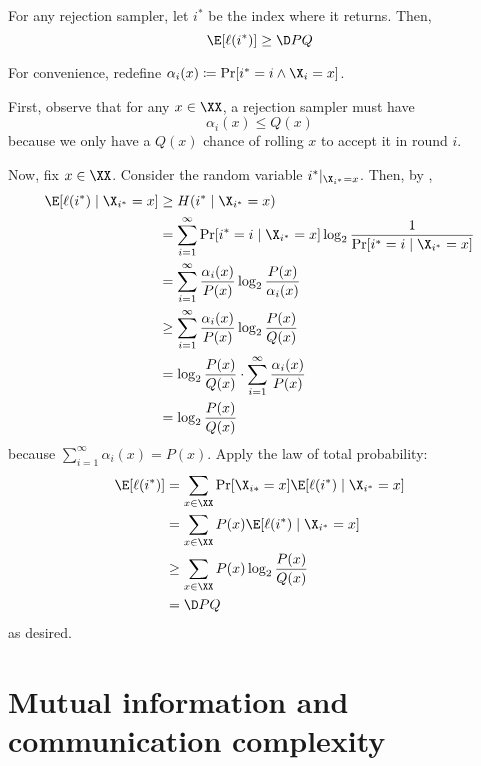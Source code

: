 \documentclass[class=co432,notes,tikz]{agony}
\begin{document}
\begin{prop}\label{prop:rejbest}
  For any rejection sampler, let $i^*$ be the index where it returns. Then,
  \[ \E[\ell(i^*)] \geq \D P Q \]
\end{prop}
\begin{prf}
  For convenience, redefine $\alpha_i(x) \coloneqq \Pr[i^* = i \land \X_i = x]$.

  First, observe that for any $x\in\XX$, a rejection sampler must have
  \[ \alpha_i(x) \leq Q(x) \]
  because we only have a $Q(x)$ chance of rolling $x$ to accept it in round $i$.

  Now, fix $x\in\XX$. Consider the random variable $i^*|_{\X_{i^*}=x}$.
  Then, by ,
  \begin{align*}
    \E[\ell(i^*) \mid \X_{i^*}=x]
     & \geq H(i^* \mid \X_{i^*}=x)                                                             \\
     & = \sum_{i=1}^\infty \Pr[i^*=i\mid \X_{i^*}=x]\log_2\frac{1}{\Pr[i^*=i \mid \X_{i^*}=x]} \\
     & = \sum_{i=1}^\infty \frac{\alpha_i(x)}{P(x)}\log_2\frac{P(x)}{\alpha_i(x)}              \\
     & \geq \sum_{i=1}^\infty \frac{\alpha_i(x)}{P(x)}\log_2\frac{P(x)}{Q(x)}                  \\
     & = \log_2\frac{P(x)}{Q(x)} \cdot \sum_{i=1}^\infty \frac{\alpha_i(x)}{P(x)}              \\
     & = \log_2\frac{P(x)}{Q(x)}
  \end{align*}
  because $\sum_{i=1}^\infty \alpha_i(x) = P(x)$.
  Apply the law of total probability:
  \begin{align*}
    \E[\ell(i^*)] & = \sum_{x\in \XX} \Pr[\X_{i*}=x] \E[\ell(i^*) \mid \X_{i^*}=x] \\
                  & = \sum_{x\in \XX} P(x) \E[\ell(i^*) \mid \X_{i^*}=x]           \\
                  & \geq \sum_{x\in \XX} P(x) \log_2 \frac{P(x)}{Q(x)}             \\
                  & = \D P Q
  \end{align*}
  as desired.
\end{prf}

\section{Mutual information and communication complexity}
\end{document}
